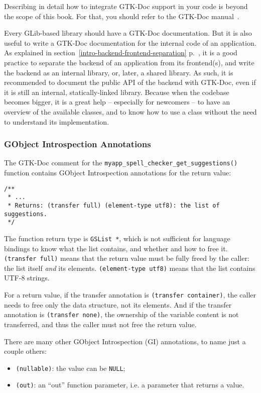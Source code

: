 Describing in detail how to integrate GTK-Doc support in your code is beyond the scope of this book. For that, you should refer to the GTK-Doc manual~\cite{gtk-doc}.

Every GLib-based library should have a GTK-Doc documentation. But it is also useful to write a GTK-Doc documentation for the internal code of an application. As explained in section~\ref{intro-backend-frontend-separation} p.~\pageref{intro-backend-frontend-separation}, it is a good practice to separate the backend of an application from its frontend(s), and write the backend as an internal library, or, later, a shared library. As such, it is recommended to document the public API of the backend with GTK-Doc, even if it is still an internal, statically-linked library. Because when the codebase becomes bigger, it is a great help -- especially for newcomers -- to have an overview of the available classes, and to know how to use a class without the need to understand its implementation.

\subsubsection{GObject Introspection Annotations}
The GTK-Doc comment for the \lstinline{myapp_spell_checker_get_suggestions()} function contains GObject Introspection annotations for the return value:
\begin{lstlisting}
/**
 * ...
 * Returns: (transfer full) (element-type utf8): the list of suggestions.
 */
\end{lstlisting}

The function return type is \lstinline{GSList *}, which is not sufficient for language bindings to know what the list contains, and whether and how to free it. \texttt{(transfer full)} means that the return value must be fully freed by the caller: the list itself \emph{and} its elements. \texttt{(element-type utf8)} means that the list contains UTF-8 strings.

For a return value, if the transfer annotation is \texttt{(transfer container)}, the caller needs to free only the data structure, not its elements. And if the transfer annotation is \texttt{(transfer none)}, the ownership of the variable content is not transferred, and thus the caller must not free the return value.

There are many other GObject Introspection (GI) annotations, to name just a couple others:
\begin{itemize}
  \item \texttt{(nullable)}: the value can be \lstinline{NULL};
  \item \texttt{(out)}: an ``out'' function parameter, i.e. a parameter that returns a value.
\end{itemize}

